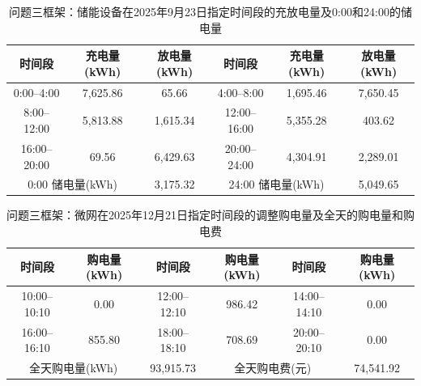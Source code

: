 \begin{table}[H]
  \centering
  \caption{问题三框架：储能设备在2025年9月23日指定时间段的充放电量及0:00和24:00的储电量}
  \label{tab:q4-3-storage-0923}
  \small
  \renewcommand{\arraystretch}{1.3}
  \begin{tabular}{|c|c|c|c|c|c|}
    \hline
    时间段 & 充电量(kWh) & 放电量(kWh) & 时间段 & 充电量(kWh) & 放电量(kWh) \\
    \hline
    0:00--4:00 & 7{,}625.86 & 65.66 & 4:00--8:00 & 1{,}695.46 & 7{,}650.45 \\
    \hline
    8:00--12:00 & 5{,}813.88 & 1{,}615.34 & 12:00--16:00 & 5{,}355.28 & 403.62 \\
    \hline
    16:00--20:00 & 69.56 & 6{,}429.63 & 20:00--24:00 & 4{,}304.91 & 2{,}289.01 \\
    \hline
    \multicolumn{2}{|c|}{0:00 储电量(kWh)} & \multicolumn{1}{c|}{3{,}175.32} & \multicolumn{2}{c|}{24:00 储电量(kWh)} & \multicolumn{1}{c|}{5{,}049.65} \\
    \hline
  \end{tabular}
\end{table}

\begin{table}[H]
  \centering
  \caption{问题三框架：微网在2025年12月21日指定时间段的调整购电量及全天的购电量和购电费}
  \label{tab:q4-3-adj-1221}
  \small
  \renewcommand{\arraystretch}{1.3}
  \begin{tabular}{|c|c|c|c|c|c|}
    \hline
    时间段 & 购电量(kWh) & 时间段 & 购电量(kWh) & 时间段 & 购电量(kWh) \\
    \hline
    10:00--10:10 & 0.00 & 12:00--12:10 & 986.42 & 14:00--14:10 & 0.00 \\
    \hline
    16:00--16:10 & 855.80 & 18:00--18:10 & 708.69 & 20:00--20:10 & 0.00 \\
    \hline
    \multicolumn{2}{|c|}{全天购电量(kWh)} & \multicolumn{1}{c|}{93{,}915.73} & \multicolumn{2}{c|}{全天购电费(元)} & \multicolumn{1}{c|}{74{,}541.92} \\
    \hline
  \end{tabular}
\end{table}

